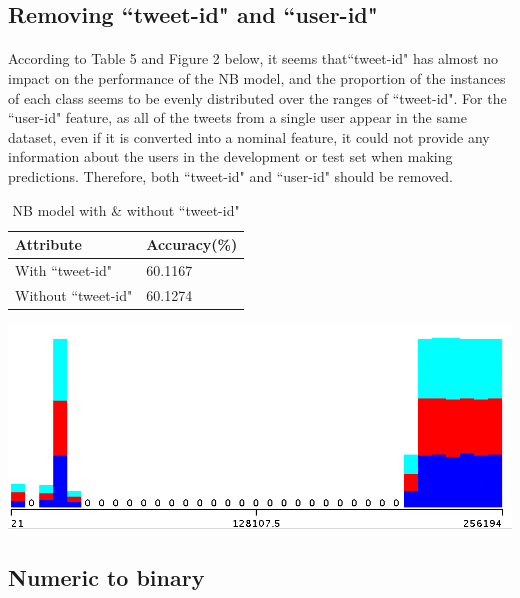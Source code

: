 \documentclass[11pt]{article}
\begin{document}
\subsection{Removing ``tweet-id" and ``user-id"}

\paragraph{} According to Table 5 and Figure 2 below, it seems that``tweet-id" has almost no impact on the performance of the NB model, and the proportion of the instances of each class seems to be evenly distributed over the ranges of ``tweet-id". For the ``user-id" feature, as all of the tweets from a single user appear in the same dataset, even if it is converted into a nominal feature, it could not provide any information about the users in the development or test set when making predictions. Therefore, both ``tweet-id" and ``user-id" should be removed.

\begin{table}[!htbp]
 \begin{center}
\begin{tabular}{| l | l |}
      \hline
      Attribute & Accuracy(\%) \\
      \hline\hline
      With ``tweet-id" & 60.1167 \\
      Without ``tweet-id" & 60.1274 \\
      \hline
\end{tabular}
\caption{NB model with \& without ``tweet-id"}\label{table2}
 \end{center}
\end{table}

\includegraphics[scale=0.4]{"tid-class"}

\subsection{Numeric to binary}
\end{document}
